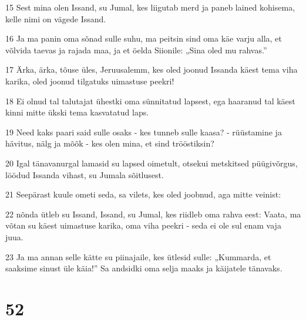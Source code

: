 \par 15 Sest mina olen Issand, su Jumal, kes liigutab merd ja paneb lained kohisema, kelle nimi on vägede Issand.
\par 16 Ja ma panin oma sõnad sulle suhu, ma peitsin sind oma käe varju alla, et võlvida taevas ja rajada maa, ja et öelda Siionile: „Sina oled mu rahvas.”
\par 17 Ärka, ärka, tõuse üles, Jeruusalemm, kes oled joonud Issanda käest tema viha karika, oled joonud tilgatuks uimastuse peekri!
\par 18 Ei olnud tal talutajat ühestki oma sünnitatud lapsest, ega haaranud tal käest kinni mitte ükski tema kasvatatud laps.
\par 19 Need kaks paari said sulle osaks - kes tunneb sulle kaasa? - rüüstamine ja hävitus, nälg ja mõõk - kes olen mina, et sind trööstiksin?
\par 20 Igal tänavanurgal lamasid su lapsed oimetult, otsekui metskitsed püügivõrgus, löödud Issanda vihast, su Jumala sõitlusest.
\par 21 Seepärast kuule ometi seda, sa vilets, kes oled joobnud, aga mitte veinist:
\par 22 nõnda ütleb su Issand, Issand, su Jumal, kes riidleb oma rahva eest: Vaata, ma võtan su käest uimastuse karika, oma viha peekri - seda ei ole sul enam vaja juua.
\par 23 Ja ma annan selle kätte su piinajaile, kes ütlesid sulle: „Kummarda, et saaksime sinust üle käia!” Sa andsidki oma selja maaks ja käijatele tänavaks.

\chapter{52}

